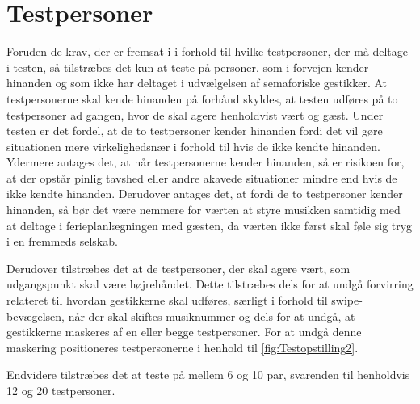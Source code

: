 \section{Testpersoner}
\label{TestpersonerSocialAccept}
%
Foruden de krav, der er fremsat i  i forhold til hvilke testpersoner, der må deltage i testen, så tilstræbes det kun at teste på personer, som i forvejen kender hinanden og som ikke har deltaget i udvælgelsen af semaforiske gestikker. At testpersonerne skal kende hinanden på forhånd skyldes, at testen udføres på to testpersoner ad gangen, hvor de skal agere henholdvist vært og gæst. Under testen er det fordel, at de to testpersoner kender hinanden fordi det vil gøre situationen mere virkelighedsnær i forhold til hvis de ikke kendte hinanden. Ydermere antages det, at når testpersonerne kender hinanden, så er risikoen for, at der opstår pinlig tavshed eller andre akavede situationer mindre end hvis de ikke kendte hinanden. Derudover antages det, at fordi de to testpersoner kender hinanden, så bør det være nemmere for værten at styre musikken samtidig med at deltage i ferieplanlægningen med gæsten, da værten ikke først skal føle sig tryg i en fremmeds selskab.

Derudover tilstræbes det at de testpersoner, der skal agere vært, som udgangspunkt skal være højrehåndet. Dette tilstræbes dels for at undgå forvirring relateret til hvordan gestikkerne skal udføres, særligt i forhold til swipe-bevægelsen, når der skal skiftes musiknummer og dels for at undgå, at gestikkerne maskeres af en eller begge testpersoner. For at undgå denne maskering positioneres testpersonerne i henhold til \autoref{fig:Testopstilling2}.

Endvidere tilstræbes det at teste på mellem 6 og 10 par, svarenden til henholdvis 12 og 20 testpersoner. 